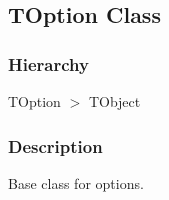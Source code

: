 \documentclass{report}
\begin{document}
\subsection*{TOption Class}
\fi
\label{PasDoc_OptionParser.TOption}
\subsubsection*{\large{\textbf{Hierarchy}}\normalsize\hspace{1ex}\hfill}
TOption {$>$} TObject
\subsubsection*{\large{\textbf{Description}}\normalsize\hspace{1ex}\hfill}
Base class for options.\hfill\vspace*{1ex}
\end{document}
